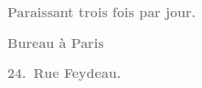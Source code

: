 \pstart
           \begin{otherlanguage}{french}\textcolor{gray}{\textbf{\textbf{Paraissant trois fois par jour.}}}\end{otherlanguage}\pend
           
\pstart
           \begin{otherlanguage}{french}\textcolor{gray}{\textbf{\textbf{Bureau à Paris}}}\end{otherlanguage}\pend
           
\pstart
           \begin{otherlanguage}{french}\textcolor{gray}{\textbf{\textbf{24. Rue Feydeau.}}}\end{otherlanguage}\pend
           
